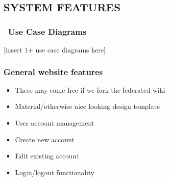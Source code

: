 \documentclass[letterpaper, 10pt, draftclsnofoot, onecolumn]{IEEEtran}
\begin{document}
\clearpage\setcounter{page}{1}\pagestyle{Convertv}
\subsection[SYSTEM
FEATURES]{\rmfamily\bfseries\color{black}
SYSTEM FEATURES}

\subsubsection[\ Use Case
Diagrams]{\foreignlanguage{english}{\ }\foreignlanguage{english}{Use
Case Diagrams}}
{\color{black}
[insert 1+ use case diagrams here]}

\subsubsection[System feature 1: [ General Website Features
{]}]{\rmfamily\bfseries\color{black} General website features 
}
\begin{itemize}
\item These may come free if we fork the federated wiki
\item Material/otherwise nice looking design template
\item User account management
\item Create new account
\item Edit existing account
\item Login/logout functionality
\end{itemize}
\end{document}
